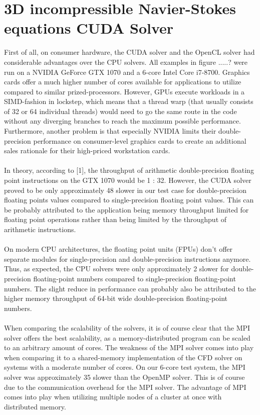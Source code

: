 \documentclass{article}%
\begin{document}
\section{3D incompressible Navier-Stokes equations CUDA Solver}
First of all, on consumer hardware, the CUDA solver and the OpenCL solver had considerable advantages over the CPU solvers. All examples in figure .....? were run on a NVIDIA GeForce GTX 1070 and a 6-core Intel Core i7-8700. Graphics cards offer a much higher number of cores available for applications to utilize compared to similar prized-processors. However, GPUs execute workloads in a SIMD-fashion in lockstep, which means that a thread warp (that usually consists of 32 or 64 individual threads) would need to go the same route in the code without any diverging branches to reach the maximum possible performance. Furthermore, another problem is that especially NVIDIA limits their double-precision performance on consumer-level graphics cards to create an additional sales rationale for their high-priced workstation cards.\\
\\
In theory, according to [1], the throughput of arithmetic double-precision floating point instructions on the GTX 1070 would be 1 : 32. However, the CUDA solver proved to be only approximately 48\text{\%} slower in our test case for double-precision floating points values compared to single-precision floating point values. This can be probably attributed to the application being memory throughput limited for floating point operations rather than being limited by the throughput of arithmetic instructions.\\
\\
On modern CPU architectures, the floating point units (FPUs) don’t offer separate modules for single-precision and double-precision instructions anymore. Thus, as expected, the CPU solvers were only approximately 2\text{\%} slower for double-precision floating-point numbers compared to single-precision floating-point numbers. The slight reduce in performance can probably also be attributed to the higher memory throughput of 64-bit wide double-precision floating-point numbers.\\
\\
When comparing the scalability of the solvers, it is of course clear that the MPI solver offers the best scalability, as a memory-distributed program can be scaled to an arbitrary amount of cores. The weakness of the MPI solver comes into play when comparing it to a shared-memory implementation of the CFD solver on systems with a moderate number of cores. On our 6-core test system, the MPI solver was approximately 35\text{\%} slower than the OpenMP solver. This is of course due to the communication overhead for the MPI solver. The advantage of MPI comes into play when utilizing multiple nodes of a cluster at once with distributed memory.
\end{document}
